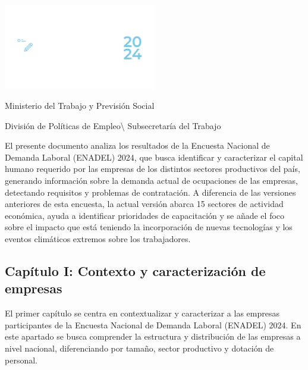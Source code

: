 \documentclass[
  11pt,
]{article}
\author{}
\date{}
\renewcommand*\contentsname{Tabla de contenidos}
\newcommand\contentsname{Tabla de contenidos}
\begin{document}




\pagecolor{customblue} 
\thispagestyle{empty} 
\color{white}

\centering

\includegraphics[width=0.5\textwidth]{../Logotipo ENADEL/Logotipo ENADEL-02.png}
\vspace{2cm}

\noindent Ministerio del Trabajo y Previsión Social

División de Políticas de Empleo\textbackslash{} Subsecretaría del
Trabajo

\justifying

El presente documento analiza los resultados de la Encuesta Nacional de
Demanda Laboral (ENADEL) 2024, que busca identificar y caracterizar el
capital humano requerido por las empresas de los distintos sectores
productivos del país, generando información sobre la demanda actual de
ocupaciones de las empresas, detectando requisitos y problemas de
contratación. A diferencia de las versiones anteriores de esta encuesta,
la actual versión abarca 15 sectores de actividad económica, ayuda a
identificar prioridades de capacitación y se añade el foco sobre el
impacto que está teniendo la incorporación de nuevas tecnologías y los
eventos climáticos extremos sobre los trabajadores.

\newpage
\nopagecolor
\color{black}
\renewcommand{\contentsname}{Índice} 
\tableofcontents

\newpage

\subsection{Capítulo I: Contexto y caracterización de
empresas}\label{capuxedtulo-i-contexto-y-caracterizaciuxf3n-de-empresas}

El primer capítulo se centra en contextualizar y caracterizar a las
empresas participantes de la Encuesta Nacional de Demanda Laboral
(ENADEL) 2024. En este apartado se busca comprender la estructura y
distribución de las empresas a nivel nacional, diferenciando por tamaño,
sector productivo y dotación de personal.
\end{document}
